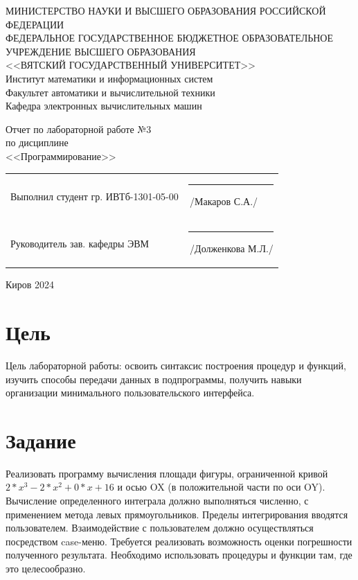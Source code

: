\documentclass[a4paper,14pt]{extarticle}
\begin{document}
	
	\newpage\thispagestyle{empty}
	\begin{center}
		\MakeUppercase{
			Министерство науки и высшего образования Российской Федерации\\
			Федеральное государственное бюджетное образовательное учреждение высшего образования\\
			<<Вятский Государственный Университет>>\\
		}
		Институт математики и информационных систем\\
		Факультет автоматики и вычислительной техники\\
		Кафедра электронных вычислительных машин
	\end{center}
	\vfill
	
	\begin{center}
		Отчет по лабораторной работе №3\\
		по дисциплине\\
		<<Программирование>>\\
	\end{center}
	\vfill
	
	\noindent
	\begin{tabular}{ll}
		Выполнил студент гр. ИВТб-1301-05-00 \hspace{5mm} &
		\rule[-1mm]{25mm}{0.10mm}\,/Макаров С.А./\\
		
		Руководитель зав. кафедры ЭВМ & \rule[-1mm]{25mm}{0.10mm}\,/Долженкова М.Л./\\
	\end{tabular}
	
	\vfill
	\begin{center}
		Киров 2024
	\end{center}
	
	\newpage
	\section*{Цель}
	Цель лабораторной работы: освоить синтаксис построения процедур и функций, изучить способы передачи данных в подпрограммы, получить навыки организации минимального пользовательского интерфейса.
	
	\section*{Задание}
	Реализовать программу вычисления площади фигуры, ограниченной кривой
	$2 * x^3 -2 * x^2 + 0 * x + 16$ и осью OX (в положительной части по оси OY). Вычисление определенного интеграла должно выполняться численно, с применением метода левых прямоугольников. Пределы интегрирования вводятся пользователем. Взаимодействие с пользователем должно осуществляться посредством case-меню. Требуется реализовать возможность оценки погрешности полученного результата. Необходимо использовать процедуры и функции там, где это целесообразно.
	
\end{document}
